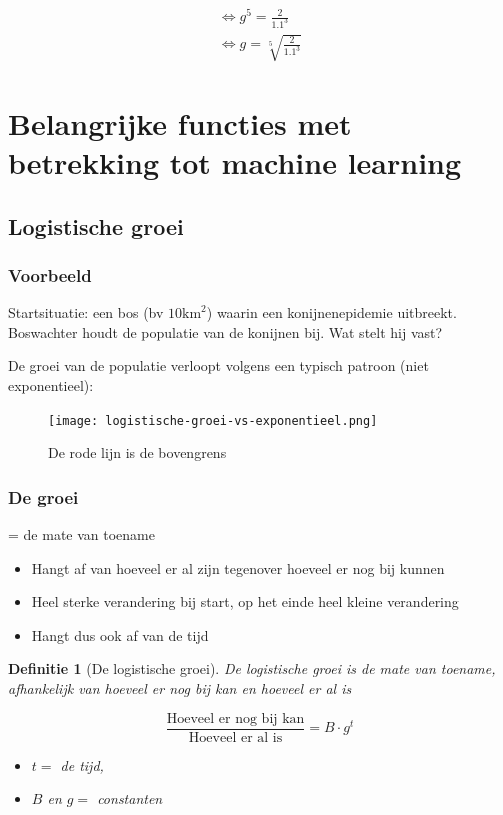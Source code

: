 \documentclass{article}
\newtheorem{theorem}{Definitie}[section]
\begin{document}
\begin{align*}
\Leftrightarrow g^5 = \frac{2}{1.1^3}\\
\Leftrightarrow g = \sqrt[5]{\frac{2}{1.1^3}}
\end{align*}

\section{Belangrijke functies met betrekking tot machine learning}

\subsection{Logistische groei}

\subsubsection{Voorbeeld}

Startsituatie: een bos (bv $\text{10km}^2$) waarin een konijnenepidemie uitbreekt.
Boswachter houdt de populatie van de konijnen bij. Wat stelt hij vast?

De groei van de populatie verloopt volgens een typisch patroon (niet exponentieel):

\begin{figure}[H]
    \centering
    \texttt{[image: logistische-groei-vs-exponentieel.png]}
    \caption{De rode lijn is de bovengrens}
\end{figure}

\subsubsection{De groei}

= de mate van toename

\begin{itemize}
    \item Hangt af van hoeveel er al zijn tegenover hoeveel er nog bij kunnen
    \item Heel sterke verandering bij start, op het einde heel kleine verandering
    \item Hangt dus ook af van de tijd
\end{itemize}

\begin{theorem}[De logistische groei]
De logistische groei is de mate van toename, afhankelijk van hoeveel er nog bij kan en hoeveel er al is

\begin{equation}
    \frac{\text{Hoeveel er nog bij kan}}{\text{Hoeveel er al is}} = B \cdot g^t
\end{equation}

\begin{itemize}
    \item $t =$ de tijd,
    \item $B$ en $g =$ constanten
\end{itemize}


\end{theorem}
\end{document}
